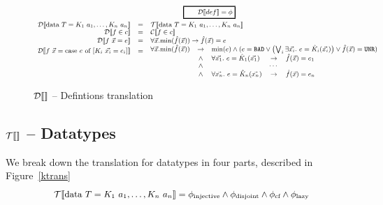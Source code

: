 \documentclass[preprint]{sigplanconf}
\begin{document}
\newcommand{\fullfxs}{\full{f}(\vec{x})}
\begin{figure}
\[
\begin{array}{rcl}
  \multicolumn{3}{c}{\ruleform{\dtrans{def} = \phi}} \\[2.5mm]
  \dtrans{\mbox{data } T = K_1~a_1, \dots, K_n~a_n} &=& \ttrans{\mbox{data } T = K_1~a_1, \dots, K_n~a_n} \\
  \dtrans{f \in c} &=& \ctrans{f \in c}\\
  \dtrans{f~\vec{x} = e} &=& \forall \vec{x}.\min{\fullfxs} 
                                              \to \fullfxs = e \\
   \raisebox{ 0.5 cm }{$\dtrans{f~\vec{x} = \mbox{case } e \mbox{ of } [K_i~\vec{x_i} = e_i]}$} &\raisebox{0.5cm}{=}&  \hspace{-0.18cm} \begin{array}{rclcl}
     \forall \vec{x}. \min{\fullfxs} &\to&
     \multicolumn{3}{c}{  \min{e} \land (e = \texttt{BAD} \lor
       \left(\bigvee_i \exists \vec{x_i}.~e = \full{K}_i(\vec{x_i})\right) \lor \fullfxs = \texttt{UNR})} \\
     &\land& \forall \vec{x_1}.~e = \full{K}_1(\vec{x_1}) &\to& \fullfxs = e_1 \\
     &\land& & \cdots & \\
     &\land& \forall \vec{x_n}.~e = \full{K}_n(\vec{x_n}) &\to& \fullfxs = e_n \\
   \end{array} 
\end{array}
\]
\caption{$\dtrans{}$ -- Defintions translation}
 \label{dtrans}
\end{figure}



\subsection{$\ttrans{}$ -- Datatypes}
We break down the translation for datatypes in four parts, described in Figure~\ref{ktrans}
$$\ttrans{\mbox{data } T = K_1~a_1, \dots, K_n~a_n} = \phi_\text{injective} \land \phi_\text{disjoint} \land \phi_\text{cf} \land \phi_\text{lazy}$$
\end{document}
